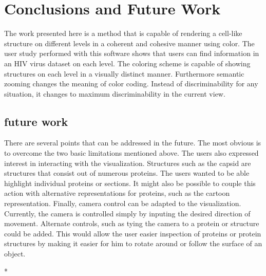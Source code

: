 \documentclass[review,journal]{vgtc}         %
\begin{document}
\section{Conclusions and Future Work}
The work presented here is a method that is capable of rendering a cell-like structure on different levels in a coherent and cohesive manner using color. 
The user study performed with this software shows that users can find information in an HIV virus dataset on each level. 
The coloring scheme is capable of showing structures on each level in a visually distinct manner. 
Furthermore semantic zooming changes the meaning of color coding. Instead of discriminability for any situation, it changes to maximum discriminability in the current view.






\subsection{future work}
There are several points that can be addressed in the future. The most obvious is to overcome the two basic limitations mentioned above. 
The users also expressed interest in interacting with the visualization. 
Structures such as the capsid are structures that consist out of numerous proteins. 
The users wanted to be able highlight individual proteins or sections. 
It might also be possible to couple this action with alternative representations for proteins, such as the cartoon representation.
Finally, camera control can be adapted to the visualization. 
Currently, the camera is controlled simply by inputing the desired direction of movement. 
Alternate controls, such as tying the camera to a protein or structure could be added.
This would allow the user easier inspection of proteins or protein structures by making it easier for him to rotate around or follow the surface of an object.





{*}

\end{document}
